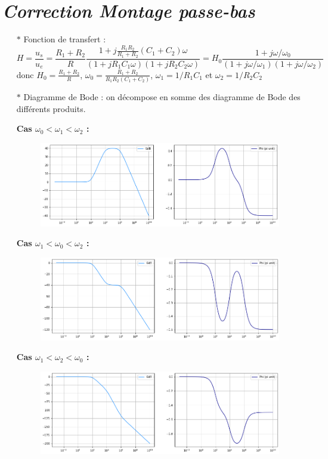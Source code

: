 \documentclass{report}
\begin{document}
\newpage

\section*{\textit{Correction Montage passe-bas}}

\begin{itemize}

	\item[$\ast$] Fonction de transfert :
\begin{equation}
	H=\frac{u_s}{u_e}=\frac{R_1+R_2}{R}\frac{1+j\frac{R_1R_2}{R_1+R_2}(C_1+C_2)\omega}{(1+jR_1C_1\omega)(1+jR_2C_2\omega)}=H_0\frac{1+j\omega/\omega_0}{(1+j\omega/\omega_1)(1+j\omega/\omega_2)}
\end{equation}
donc $H_0=\frac{R_1+R_2}{R}$, $\omega_0=\frac{R_1+R_2}{R_1R_2(C_1+C_2)}$, $\omega_1=1/R_1C_1$ et $\omega_2=1/R_2C_2$

	\item[$\ast$] Diagramme de Bode : on décompose en somme des diagramme de Bode des différents produits.

\textbf{Cas $\omega_0<\omega_1<\omega_2$ :}
\begin{figure}[!h]
	\centering
	\includegraphics[width=0.8\linewidth]{exo2_0.png}
\end{figure}

\textbf{Cas $\omega_1<\omega_0<\omega_2$ :}
\begin{figure}[!h]
	\centering
	\includegraphics[width=0.8\linewidth]{exo2_1.png}
\end{figure}

\textbf{Cas $\omega_1<\omega_2<\omega_0$ :}
\begin{figure}[!h]
	\centering
	\includegraphics[width=0.8\linewidth]{exo2_2.png}
\end{figure}


\end{itemize}
\end{document}
